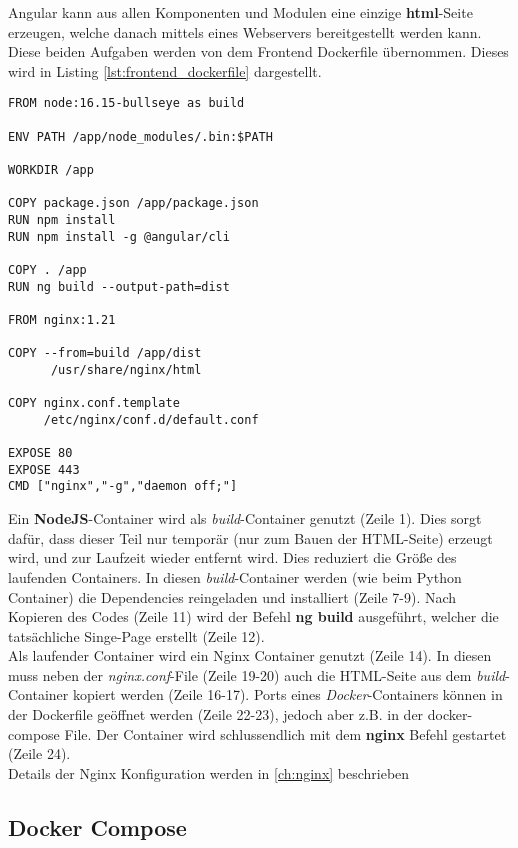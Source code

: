 Angular kann aus allen Komponenten und Modulen eine einzige \textbf{html}-Seite erzeugen, welche danach mittels eines Webservers bereitgestellt werden kann. Diese beiden Aufgaben werden von dem Frontend Dockerfile übernommen. Dieses wird in Listing \ref{lst:frontend_dockerfile} dargestellt.

\begin{lstlisting}[caption={Backend Dockerfile},captionpos=b,showstringspaces=false, basicstyle=\small,label={lst:frontend_dockerfile}]
FROM node:16.15-bullseye as build

ENV PATH /app/node_modules/.bin:$PATH

WORKDIR /app

COPY package.json /app/package.json
RUN npm install
RUN npm install -g @angular/cli

COPY . /app
RUN ng build --output-path=dist

FROM nginx:1.21

COPY --from=build /app/dist
      /usr/share/nginx/html

COPY nginx.conf.template 
     /etc/nginx/conf.d/default.conf

EXPOSE 80
EXPOSE 443
CMD ["nginx","-g","daemon off;"]
\end{lstlisting}

Ein \textbf{NodeJS}-Container wird als \textit{build}-Container genutzt (Zeile 1). 
Dies sorgt dafür, dass dieser Teil nur temporär (nur zum Bauen der HTML-Seite) erzeugt wird, und zur Laufzeit wieder entfernt wird.
Dies reduziert die Größe des laufenden Containers.
In diesen \textit{build}-Container werden (wie beim Python Container) die Dependencies reingeladen und installiert (Zeile 7-9).
Nach Kopieren des Codes (Zeile 11) wird der Befehl \textbf{ng build} ausgeführt, welcher die tatsächliche Singe-Page erstellt (Zeile 12). \\
Als laufender Container wird ein Nginx Container genutzt (Zeile 14).
In diesen muss neben der \textit{nginx.conf}-File (Zeile 19-20) auch die HTML-Seite aus dem \textit{build}-Container kopiert werden (Zeile 16-17).
Ports eines \textit{Docker}-Containers können in der Dockerfile geöffnet werden (Zeile 22-23), jedoch aber z.B. in der docker-compose File.
Der Container wird schlussendlich mit dem \textbf{nginx} Befehl gestartet (Zeile 24).\\
Details der Nginx Konfiguration werden in \ref{ch:nginx} beschrieben


\subsection{Docker Compose}

